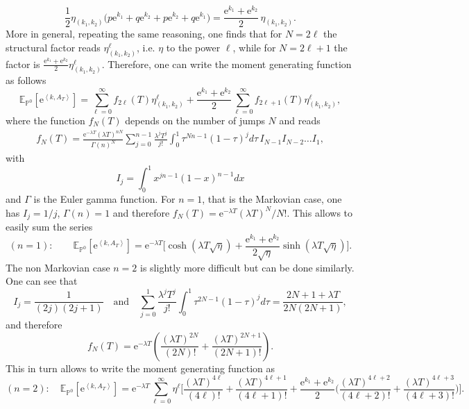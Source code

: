 \documentclass[a4paper,11pt]{article}
\numberwithin{equation}{section}
\begin{document}
\begin{equation*}
    \frac{1}{2}\eta_{(k_1,k_2)} \Big( p\mathrm{e}^{k_1} + q\mathrm{e}^{k_2} + p\mathrm{e}^{k_2} + q\mathrm{e}^{k_1} \Big) = \frac{\mathrm{e}^{k_1} + \mathrm{e}^{k_2}}{2} \, \eta_{(k_1,k_2)}.
\end{equation*}
More in general, repeating the same reasoning, one finds that for $N=2\ell$ the structural factor reads $\eta_{(k_1,k_2)}^\ell$, i.e. $\eta$ to the power $\ell$, while for $N=2\ell +1$ the factor is $\frac{\mathrm{e}^{k_1} + \mathrm{e}^{k_2}}{2}\eta_{(k_1,k_2)}^\ell$.
Therefore, one can write the moment generating function as follows 
\begin{equation}
    \mathbb{E}_{\mathbb{P}^0} \left[ \mathrm{e}^{\left\langle k, A_T \right\rangle} \right] = \sum_{\ell=0}^\infty f_{2\ell}(T) \eta_{(k_1,k_2)}^\ell + \frac{\mathrm{e}^{k_1}+\mathrm{e}^{k_2}}{2} \sum_{\ell=0}^\infty f_{2\ell+1}(T) \eta_{(k_1,k_2)}^\ell,
\end{equation}
where the function $f_N(T)$ depends on the number of jumps $N$ and reads
\begin{align}
    f_N(T)= \frac{\mathrm{e}^{-\lambda T} (\lambda T)^{nN}}{\Gamma(n)^N} \sum_{j=0}^{n-1}\frac{\lambda^j T^j}{j!} \int_0^1 \tau^{Nn-1} (1-\tau)^j d\tau \, I_{N-1}I_{N-2} \ldots I_1,
\end{align}
with $$I_j= \int_0^1 x^{jn-1}(1-x)^{n-1} dx$$ and $\Gamma$ is the Euler gamma function.
For $n=1$, that is the Markovian case, one has $I_j=1/j$, $\Gamma(n)=1$ and therefore $f_N(T)= \mathrm{e}^{-\lambda T} (\lambda T)^{N}/N!$. This allows to easily sum the series 
\begin{equation}
    (n=1): \qquad \mathbb{E}_{\mathbb{P}^0} \left[ \mathrm{e}^{\left\langle k, A_T \right\rangle} \right] = \mathrm{e}^{-\lambda T} \big[ \cosh(\lambda T \sqrt{\eta}) + \frac{\mathrm{e}^{k_1}+\mathrm{e}^{k_2}}{2\sqrt{\eta}}\sinh(\lambda T \sqrt{\eta}) \big].
\end{equation}
The non Markovian case $n=2$ is slightly more difficult but can be done similarly. One can see that $$
I_j= \frac{1}{(2j)(2j+1)} \quad \text{and} \quad \sum_{j=0}^{1}\frac{\lambda^j T^j}{j!} \int_0^1 \tau^{2N-1} (1-\tau)^j d\tau = \frac{2N + 1 + \lambda T}{2N(2N+1)}, $$
and therefore
\begin{equation}
     f_N(T)= \mathrm{e}^{-\lambda T}  \left( \frac{ (\lambda T)^{2N}}{(2N)!} + \frac{ (\lambda T)^{2N+1}}{(2N+1)!}  \right) .
\end{equation}
This in turn allows to write the moment generating function as
\begin{equation}
    (n=2): \quad \mathbb{E}_{\mathbb{P}^0} \left[ \mathrm{e}^{\left\langle k, A_T \right\rangle} \right] = \mathrm{e}^{-\lambda T} \sum_{\ell=0}^\infty \eta^\ell \big[ \frac{ (\lambda T)^{4\ell}}{(4\ell)!} + \frac{ (\lambda T)^{4\ell+1}}{(4\ell+1)!}  + \frac{\mathrm{e}^{k_1}+\mathrm{e}^{k_2}}{2} \big( \frac{ (\lambda T)^{4\ell+2}}{(4\ell+2)!} + \frac{ (\lambda T)^{4\ell+3}}{(4\ell+3)!}  \big)  \big] .
\end{equation}
\end{document}
